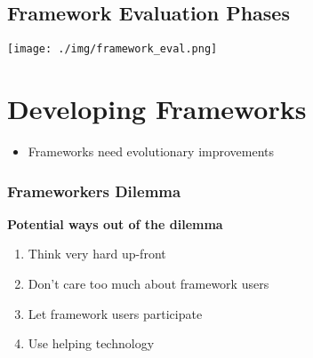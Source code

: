 \subsection{Framework Evaluation Phases}
\texttt{[image: ./img/framework\_eval.png]}

\section{Developing Frameworks}
\begin{itemize}
    \item Frameworks need evolutionary improvements
\end{itemize}
\subsubsection{Frameworkers Dilemma}
\textbf{Potential ways out of the dilemma}
\begin{enumerate}
    \item Think very hard up-front
    \item Don't care too much about framework users
    \item Let framework users participate
    \item Use helping technology
\end{enumerate}